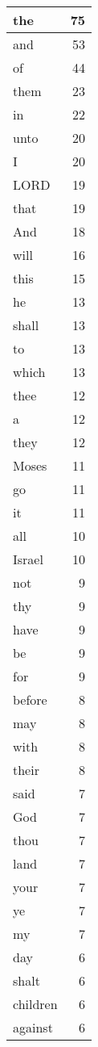 \begin{center}
\begin{longtable}{l|r}
\hline \hline
\endlastfoot
the & 75 \\ \hline
and & 53 \\ \hline
of & 44 \\ \hline
them & 23 \\ \hline
in & 22 \\ \hline
unto & 20 \\ \hline
I & 20 \\ \hline
LORD & 19 \\ \hline
that & 19 \\ \hline
And & 18 \\ \hline
will & 16 \\ \hline
this & 15 \\ \hline
he & 13 \\ \hline
shall & 13 \\ \hline
to & 13 \\ \hline
which & 13 \\ \hline
thee & 12 \\ \hline
a & 12 \\ \hline
they & 12 \\ \hline
Moses & 11 \\ \hline
go & 11 \\ \hline
it & 11 \\ \hline
all & 10 \\ \hline
Israel & 10 \\ \hline
not & 9 \\ \hline
thy & 9 \\ \hline
have & 9 \\ \hline
be & 9 \\ \hline
for & 9 \\ \hline
before & 8 \\ \hline
may & 8 \\ \hline
with & 8 \\ \hline
their & 8 \\ \hline
said & 7 \\ \hline
God & 7 \\ \hline
thou & 7 \\ \hline
land & 7 \\ \hline
your & 7 \\ \hline
ye & 7 \\ \hline
my & 7 \\ \hline
day & 6 \\ \hline
shalt & 6 \\ \hline
children & 6 \\ \hline
against & 6 \\ \hline

\end{longtable}
\end{center}
